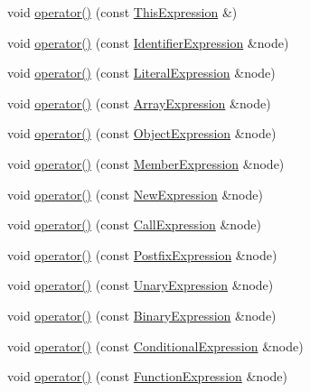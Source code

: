 \begin{DoxyCompactItemize}
\item 
void \hyperlink{struct_basic_visitor_a324c1fa1804aca5286a60c74b7d67997}{operator()} (const \hyperlink{struct_this_expression}{This\+Expression} \&)
\item 
void \hyperlink{struct_basic_visitor_a3055e7fe6f87a3b1396a0f334ef5d6b7}{operator()} (const \hyperlink{struct_identifier_expression}{Identifier\+Expression} \&node)
\item 
void \hyperlink{struct_basic_visitor_a082a01528e44eba34fe48a1ec2186956}{operator()} (const \hyperlink{struct_literal_expression}{Literal\+Expression} \&node)
\item 
void \hyperlink{struct_basic_visitor_afa358b418987b2fe3c93c5d09d06251b}{operator()} (const \hyperlink{struct_array_expression}{Array\+Expression} \&node)
\item 
void \hyperlink{struct_basic_visitor_aedba37b1625d76b80bd4b1a636e360c7}{operator()} (const \hyperlink{struct_object_expression}{Object\+Expression} \&node)
\item 
void \hyperlink{struct_basic_visitor_ac9a891133f4ee31a34c0b0584f816e20}{operator()} (const \hyperlink{struct_member_expression}{Member\+Expression} \&node)
\item 
void \hyperlink{struct_basic_visitor_a2a571e28c7b4f80b3ec8fabcb00a49c5}{operator()} (const \hyperlink{struct_new_expression}{New\+Expression} \&node)
\item 
void \hyperlink{struct_basic_visitor_a8dbbfb33bdb5ea39bb6c721b44edcc4c}{operator()} (const \hyperlink{struct_call_expression}{Call\+Expression} \&node)
\item 
void \hyperlink{struct_basic_visitor_a30af83cdfc65c4888d5d226a975f1f7c}{operator()} (const \hyperlink{struct_postfix_expression}{Postfix\+Expression} \&node)
\item 
void \hyperlink{struct_basic_visitor_ac26ca5f6012bbfdafdc91ad8f896a3d4}{operator()} (const \hyperlink{struct_unary_expression}{Unary\+Expression} \&node)
\item 
void \hyperlink{struct_basic_visitor_a354c75bf84d88737eed7900a9c5d2dd6}{operator()} (const \hyperlink{struct_binary_expression}{Binary\+Expression} \&node)
\item 
void \hyperlink{struct_basic_visitor_a168eeccdaf38ac6f9cc2f32feefddcc5}{operator()} (const \hyperlink{struct_conditional_expression}{Conditional\+Expression} \&node)
\item 
void \hyperlink{struct_basic_visitor_a84f04441edb226fd94d8e9db71543410}{operator()} (const \hyperlink{struct_function_expression}{Function\+Expression} \&node)

\end{DoxyCompactItemize}
